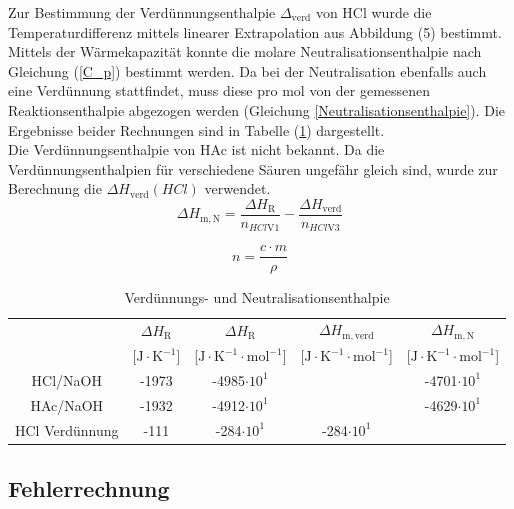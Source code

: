 \documentclass[12pt,a4paper,titlepage,headinclude,bibtotoc]{scrartcl}
\begin{document}
Zur Bestimmung der Verdünnungsenthalpie $\Delta_\mathrm{verd}$ von HCl wurde die Temperaturdifferenz mittels linearer Extrapolation aus Abbildung (5)
bestimmt. Mittels der Wärmekapazität konnte die molare Neutralisationsenthalpie nach Gleichung (\ref{C_p}) bestimmt werden. Da bei der Neutralisation ebenfalls auch eine Verdünnung stattfindet, muss diese pro mol von der gemessenen Reaktionsenthalpie abgezogen werden (Gleichung \ref{Neutralisationsenthalpie}). Die Ergebnisse beider Rechnungen sind in Tabelle (\ref{TabelleVerdNeutr}) dargestellt.\\
Die Verdünnungsenthalpie von HAc ist nicht bekannt. Da die Verdünnungsenthalpien für verschiedene Säuren ungefähr gleich sind, wurde zur Berechnung die $\Delta H_\mathrm{verd}(HCl)$ verwendet.\\

\begin{equation}\label{Neutralisationsenthalpie}
\Delta H_\mathrm{m, N}= \frac{\Delta H_\mathrm{R}}{n_{HCl \mathrm{V1}}}- \frac{\Delta H_\mathrm{verd}}{n_{HCl \mathrm{V3}}} 
\end{equation}

\begin{equation}\label{n}
n=\frac{c \cdot m}{\rho}
\end{equation}

\begin{table} \caption{Verdünnungs- und Neutralisationsenthalpie}
\label{TabelleVerdNeutr} 
\begin{tabular}{c|c|c|c|c}
& $\Delta H_\mathrm{R}$ &  $\Delta H_\mathrm{R}$  & $\Delta H_\mathrm{m, verd}$  &$\Delta H_\mathrm{m, N}$ \\
&[$\mathrm{J}\cdot \mathrm{K}^{-1}$]&[$\mathrm{J}\cdot \mathrm{K}^{-1} \cdot \mathrm{mol}^{-1}$]&[$\mathrm{J}\cdot \mathrm{K}^{-1} \cdot \mathrm{mol}^{-1}$]&[$\mathrm{J}\cdot \mathrm{K}^{-1} \cdot \mathrm{mol}^{-1}$]\\
\hline
HCl/NaOH&-1973&-4985$\cdot 10^1$&&-4701$\cdot 10^1$\\
HAc/NaOH&-1932&-4912$\cdot 10^1$&& -4629$\cdot 10^1$\\
HCl Verdünnung&-111&-284$\cdot 10^1$&-284$\cdot 10^1$&\\
\end{tabular} 
\end{table}
\FloatBarrier




\subsection{Fehlerrechnung}
\end{document}

